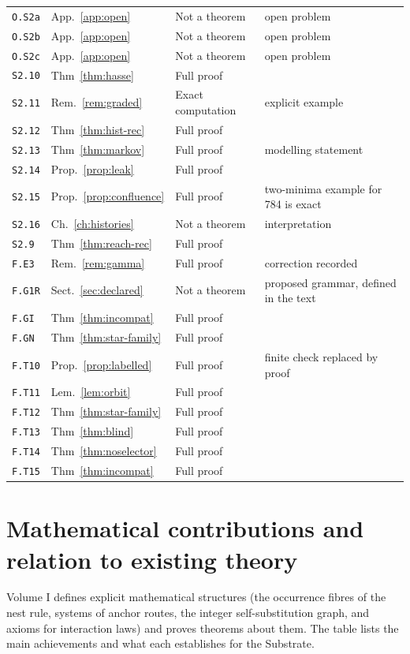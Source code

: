 \documentclass[11pt,oneside,openany]{book}
\theoremstyle{definition}
\theoremstyle{remark}
\begin{document}
\begin{longtable}{@{}p{15mm}p{33mm}p{36mm}p{36mm}@{}}
\texttt{O.S2a} & App.~\ref{app:open} & Not a theorem & open problem \\
\texttt{O.S2b} & App.~\ref{app:open} & Not a theorem & open problem \\
\texttt{O.S2c} & App.~\ref{app:open} & Not a theorem & open problem \\
\texttt{S2.10} & Thm~\ref{thm:hasse} & Full proof &  \\
\texttt{S2.11} & Rem.~\ref{rem:graded} & Exact computation & explicit example \\
\texttt{S2.12} & Thm~\ref{thm:hist-rec} & Full proof &  \\
\texttt{S2.13} & Thm~\ref{thm:markov} & Full proof & modelling statement \\
\texttt{S2.14} & Prop.~\ref{prop:leak} & Full proof &  \\
\texttt{S2.15} & Prop.~\ref{prop:confluence} & Full proof & two-minima example for 784 is exact \\
\texttt{S2.16} & Ch.~\ref{ch:histories} & Not a theorem & interpretation \\
\texttt{S2.9} & Thm~\ref{thm:reach-rec} & Full proof &  \\
\texttt{F.E3} & Rem.~\ref{rem:gamma} & Full proof & correction recorded \\
\texttt{F.G1R} & Sect.~\ref{sec:declared} & Not a theorem & proposed grammar, defined in the text \\
\texttt{F.GI} & Thm~\ref{thm:incompat} & Full proof &  \\
\texttt{F.GN} & Thm~\ref{thm:star-family} & Full proof &  \\
\texttt{F.T10} & Prop.~\ref{prop:labelled} & Full proof & finite check replaced by proof \\
\texttt{F.T11} & Lem.~\ref{lem:orbit} & Full proof & \\
\texttt{F.T12} & Thm~\ref{thm:star-family} & Full proof &  \\
\texttt{F.T13} & Thm~\ref{thm:blind} & Full proof &  \\
\texttt{F.T14} & Thm~\ref{thm:noselector} & Full proof &  \\
\texttt{F.T15} & Thm~\ref{thm:incompat} & Full proof &  \\
\bottomrule\end{longtable}
\normalsize

\chapter{Mathematical contributions and relation to existing theory}\label{app:contrib}
\small
Volume I defines explicit mathematical structures (the occurrence fibres of the nest rule, systems of anchor routes, the integer self-substitution graph, and axioms for interaction laws) and proves theorems about them. The table lists the main achievements and what each establishes for the Substrate.
\end{document}
